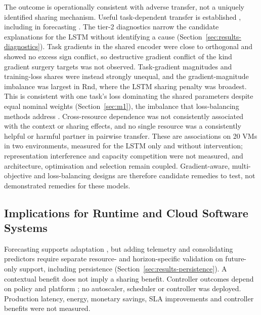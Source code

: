 \documentclass[a4paper,fleqn]{cas-dc}
\begin{document}
The outcome is operationally consistent with adverse transfer, not a uniquely
identified sharing mechanism. Useful task-dependent transfer is established
\citep{Caruana1997Multitask,Standley2020TaskGrouping,Fifty2021TaskGroupings},
including in forecasting \citep{Nikentari2022NARMAXLSTM,Nochumsohn2025MTLinear}.
The tier-2 diagnostics narrow the candidate explanations for the LSTM
without identifying a cause (Section~\ref{sec:results-diagnostics}). Task
gradients in the shared encoder were close to orthogonal and showed no
excess sign conflict, so destructive gradient conflict of the kind gradient
surgery targets \citep{Yu2020GradientSurgery} was not observed. Task-gradient
magnitudes and training-loss shares were instead strongly unequal, and the
gradient-magnitude imbalance was largest in Rnd, where the LSTM sharing
penalty was broadest. This is consistent
with one task's loss dominating the shared parameters despite equal nominal
weights (Section~\ref{sec:m1}), the imbalance that loss-balancing methods
address \citep{Chen2018GradNorm}. Cross-resource dependence was not
consistently associated with the context or sharing effects, and no single resource was a consistently
helpful or harmful partner in pairwise transfer. These are associations on
20 VMs in two environments, measured for the LSTM only and without
intervention; representation interference and capacity competition were
not measured, and architecture, optimisation and selection remain coupled.
Gradient-aware, multi-objective and loss-balancing designs
\citep{Sener2018MultiObjective,Yu2020GradientSurgery,Chen2018GradNorm} are
therefore candidate remedies to test, not demonstrated remedies for these
models.

\subsection{Implications for Runtime and Cloud Software Systems}
\label{sec:discussion-systems}

Forecasting supports adaptation \citep{Taherizadeh2018Monitoring,Bauer2020SelfAware},
but adding telemetry and consolidating predictors require separate resource-
and horizon-specific validation on future-only support, including persistence
(Section~\ref{sec:results-persistence}). A contextual benefit does not imply a
sharing benefit. Controller outcomes depend on policy and platform
\citep{Qu2018Autoscaling}; no autoscaler, scheduler or controller was deployed.
Production latency, energy, monetary savings, SLA improvements and controller
benefits were not measured.
\end{document}
